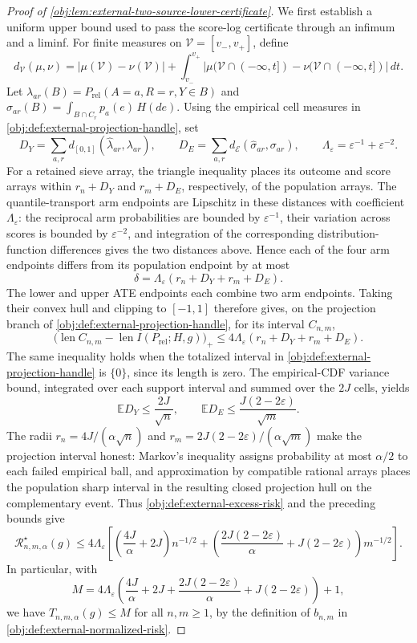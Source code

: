 \documentclass[11pt]{article}
\begin{document}
\begin{proof}[Proof of \cref{obj:lem:external-two-source-lower-certificate}]
We first establish a uniform upper bound used to pass the score-log certificate through an infimum and a liminf. For finite measures on \(\mathcal V=[v_-,v_+]\), define
\[
d_{\mathcal V}(\mu,\nu)
=|\mu(\mathcal V)-\nu(\mathcal V)|
 +\int_{v_-}^{v_+}
   |\mu(\mathcal V\cap(-\infty,t])-\nu(\mathcal V\cap(-\infty,t])|\,dt.
\]
Let \(\lambda_{ar}(B)=P_{\mathrm{rel}}(A=a,R=r,Y\in B)\) and
\(\sigma_{ar}(B)=\int_{B\cap C_r}p_a(e)\,H(de)\). Using the empirical cell measures in \cref{obj:def:external-projection-handle}, set
\[
D_Y=\sum_{a,r}d_{[0,1]}(\widehat\lambda_{ar},\lambda_{ar}),
\qquad
D_E=\sum_{a,r}d_{\mathcal E}(\widehat\sigma_{ar},\sigma_{ar}),
\qquad
\Lambda_\varepsilon=\varepsilon^{-1}+\varepsilon^{-2}.
\]
For a retained sieve array, the triangle inequality places its outcome and score arrays within \(r_n+D_Y\) and \(r_m+D_E\), respectively, of the population arrays. The quantile-transport arm endpoints are Lipschitz in these distances with coefficient \(\Lambda_\varepsilon\): the reciprocal arm probabilities are bounded by \(\varepsilon^{-1}\), their variation across scores is bounded by \(\varepsilon^{-2}\), and integration of the corresponding distribution-function differences gives the two distances above. Hence each of the four arm endpoints differs from its population endpoint by at most
\[
\delta=\Lambda_\varepsilon(r_n+D_Y+r_m+D_E).
\]
The lower and upper ATE endpoints each combine two arm endpoints. Taking their convex hull and clipping to \([-1,1]\) therefore gives, on the projection branch of \cref{obj:def:external-projection-handle}, for its interval \(C_{n,m}\),
\[
\bigl(\operatorname{len}C_{n,m}
       -\operatorname{len}I(P_{\mathrm{rel}};H,g)\bigr)_+
\le 4\Lambda_\varepsilon(r_n+D_Y+r_m+D_E).
\]
The same inequality holds when the totalized interval in \cref{obj:def:external-projection-handle} is \(\{0\}\), since its length is zero. The empirical-CDF variance bound, integrated over each support interval and summed over the \(2J\) cells, yields
\[
\mathbb E D_Y\le\frac{2J}{\sqrt n},
\qquad
\mathbb E D_E\le\frac{J(2-2\varepsilon)}{\sqrt m}.
\]
The radii \(r_n=4J/(\alpha\sqrt n)\) and
\(r_m=2J(2-2\varepsilon)/(\alpha\sqrt m)\) make the projection interval honest: Markov’s inequality assigns probability at most \(\alpha/2\) to each failed empirical ball, and approximation by compatible rational arrays places the population sharp interval in the resulting closed projection hull on the complementary event. Thus \cref{obj:def:external-excess-risk} and the preceding bounds give
\[
\mathcal R^\star_{n,m,\alpha}(g)
\le 4\Lambda_\varepsilon
\left[
 \left(\frac{4J}{\alpha}+2J\right)n^{-1/2}
 +\left(\frac{2J(2-2\varepsilon)}{\alpha}
          +J(2-2\varepsilon)\right)m^{-1/2}
\right].
\]
In particular, with
\[
M=4\Lambda_\varepsilon
\left(\frac{4J}{\alpha}+2J+
      \frac{2J(2-2\varepsilon)}{\alpha}
      +J(2-2\varepsilon)\right)+1,
\]
we have \(T_{n,m,\alpha}(g)\le M\) for all \(n,m\ge1\), by the definition of \(b_{n,m}\) in \cref{obj:def:external-normalized-risk}.


\end{proof}
\end{document}
